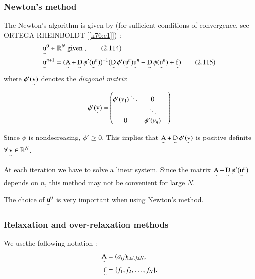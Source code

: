 \subsubsection{Newton's method}\label{c4:sss2.6.4} 
The Newton's algorithm is given by (for sufficient conditions of
convergence, see ORTEGA-RHEINBOLDT [\ref{k76:e1}]) : 
\begin{align}
& {\operatorname*{u}\limits_\sim}^0 \in \mathbb{R}^N  \text{ given },
  \tag{2.114}\label{c4:eq2.114}\\ 
& {\operatorname*{u}\limits_\sim}^{n+1} = (\operatorname*{A}\limits_\sim+ \operatorname*{D}\limits_\sim \phi'
  ({\operatorname*{u}\limits_\sim}^n))^{-1} (\operatorname*{D}\limits_\sim \phi' ({\operatorname*{u}\limits_\sim}^n)
  {\operatorname*{u}\limits_\sim}^n -\operatorname*{D}\limits_\sim \phi ({\operatorname*{u}\limits_\sim}^n) +
  \operatorname*{f}\limits_\sim) \tag{2.115}\label{c4:eq2.115} 
\end{align}
where $\phi'(\operatorname*{v}\limits_\sim)$ denotes the \textit{diagonal matrix}
\begin{equation*}
\phi'(\operatorname*{v} \limits_\sim  ) =
\begin{pmatrix}
\phi'(v_1) \ddots & 0\\
& \ddots  &\\
0 & \phi'(v_n)
\end{pmatrix}
\end{equation*}

Since $\phi$ is nondecreasing, $\phi' \geq 0$. This implies that $\operatorname*{A} \limits_\sim+\operatorname*{D} \limits_\sim \phi' (\operatorname*{v} \limits_\sim)$ is positive definite $\forall \operatorname*{v} \limits_\sim \in \mathbb{R}^N$.

\begin{remark}\label{c4:rem2.10}%
At each iteration we have to solve a linear system. Since the matrix
$\operatorname*{A}\limits_\sim + \operatorname*{D} \limits_\sim \phi'({\operatorname*{u} \limits_\sim}^n)$ depends
on $n$, this method may not be convenient for large $N$. 
\end{remark}

\begin{remark}\label{c4:rem2.11}%
The choice of ${\operatorname*{u}\limits_\sim}^0$ is very important when using
Newton's method. 
\end{remark}

\subsubsection{Relaxation and over-relaxation
  methods}\label{c4:sss2.6.5} 

We use\pageoriginale  the following notation :
\begin{align*}
\operatorname*{A}\limits_\sim & = (a_{ij})_{1 \leq i, j \leq N},\\
\operatorname*{f} \limits_\sim & = \{f_1, f_2, \ldots, f_N\}.
\end{align*}

